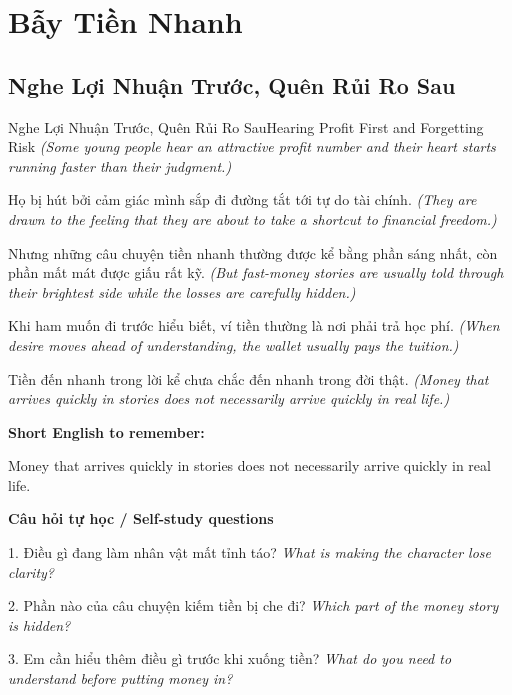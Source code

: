 \chapter{Bẫy Tiền Nhanh}

\section{Nghe Lợi Nhuận Trước, Quên Rủi Ro Sau}
\begin{truyen}{Nghe Lợi Nhuận Trước, Quên Rủi Ro Sau}{Hearing Profit First and Forgetting Risk}
\textit{(Some young people hear an attractive profit number and their heart starts running faster than their judgment.)}

Họ bị hút bởi cảm giác mình sắp đi đường tắt tới tự do tài chính.
\textit{(They are drawn to the feeling that they are about to take a shortcut to financial freedom.)}

Nhưng những câu chuyện tiền nhanh thường được kể bằng phần sáng nhất, còn phần mất mát được giấu rất kỹ.
\textit{(But fast-money stories are usually told through their brightest side while the losses are carefully hidden.)}

Khi ham muốn đi trước hiểu biết, ví tiền thường là nơi phải trả học phí.
\textit{(When desire moves ahead of understanding, the wallet usually pays the tuition.)}

\end{truyen}

\begin{baihoc}
Tiền đến nhanh trong lời kể chưa chắc đến nhanh trong đời thật.
\textit{(Money that arrives quickly in stories does not necessarily arrive quickly in real life.)}
\end{baihoc}

\begin{ghinhoanh}
\textbf{Short English to remember:}

Money that arrives quickly in stories does not necessarily arrive quickly in real life.

\end{ghinhoanh}

\begin{tuhocnhanh}
\textbf{Câu hỏi tự học / Self-study questions}

1. Điều gì đang làm nhân vật mất tỉnh táo? \textit{What is making the character lose clarity?}

2. Phần nào của câu chuyện kiếm tiền bị che đi? \textit{Which part of the money story is hidden?}

3. Em cần hiểu thêm điều gì trước khi xuống tiền? \textit{What do you need to understand before putting money in?}
\end{tuhocnhanh}
\ngancach

